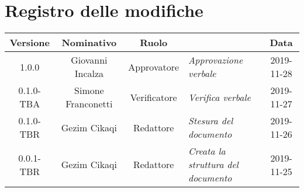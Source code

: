 \section*{Registro delle modifiche}
\renewcommand{\arraystretch}{1.8}
  
  \begin{longtable}{|c|c|c|p{3.8cm}|c|}
    \hline
    
    \rowcolor{header}
    \textbf{Versione} & \textbf{Nominativo} & \textbf{Ruolo} & \centering{\textbf{Descrizione}} & \textbf{Data}\\
    
    \hline
    
    1.0.0 & Giovanni Incalza & Approvatore & \small{\textit{Approvazione verbale}} & 2019-11-28\\
    0.1.0-TBA & Simone Franconetti & Verificatore & \small{\textit{Verifica verbale}} & 2019-11-27\\
    0.1.0-TBR & Gezim Cikaqi & Redattore & \small{\textit{Stesura del documento}} & 2019-11-26\\
    0.0.1-TBR & Gezim Cikaqi & Redattore & \small{\textit{Creata la struttura del documento}} & 2019-11-25\\
    
    \hline
  \end{longtable}